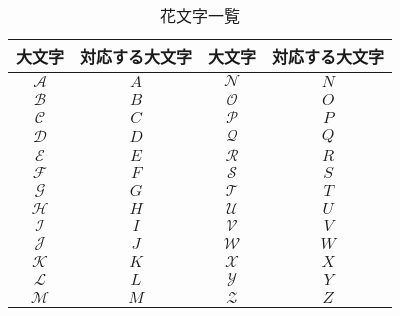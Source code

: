  \begin{table}[htbp] 
   \centering
   \captionsetup{labelformat=empty,labelsep=none} %
   \caption{花文字一覧}
   \begin{tabular}{cc|cc}
     \hline
     大文字 & 対応する大文字 & 大文字 & 対応する大文字 \\ \hline
     $\mathscr{A}$ & $A$ & $\mathscr{N}$ & $N$ \\
     $\mathscr{B}$ & $B$ & $\mathscr{O}$ & $O$ \\
     $\mathscr{C}$ & $C$ & $\mathscr{P}$ & $P$ \\
     $\mathscr{D}$ & $D$ & $\mathscr{Q}$ & $Q$ \\
     $\mathscr{E}$ & $E$ & $\mathscr{R}$ & $R$ \\
     $\mathscr{F}$ & $F$ & $\mathscr{S}$ & $S$ \\
     $\mathscr{G}$ & $G$ & $\mathscr{T}$ & $T$ \\
     $\mathscr{H}$ & $H$ & $\mathscr{U}$ & $U$ \\
     $\mathscr{I}$ & $I$ & $\mathscr{V}$ & $V$ \\
     $\mathscr{J}$ & $J$ & $\mathscr{W}$ & $W$ \\
     $\mathscr{K}$ & $K$ & $\mathscr{X}$ & $X$ \\
     $\mathscr{L}$ & $L$ & $\mathscr{Y}$ & $Y$ \\
     $\mathscr{M}$ & $M$ & $\mathscr{Z}$ & $Z$ \\ \hline
   \end{tabular}
 \end{table}
%
%
%
